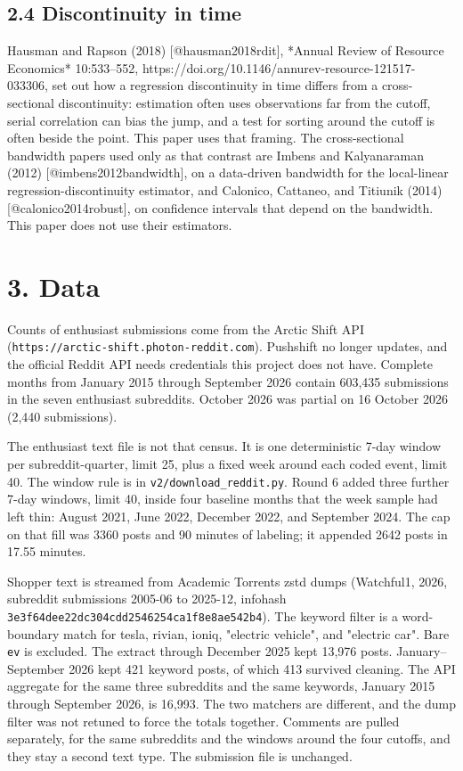 \documentclass[11pt]{article}
\begin{document}
\subsection{2.4 Discontinuity in time}

Hausman and Rapson (2018) [@hausman2018rdit], *Annual Review of Resource Economics* 10:533–552, https://doi.org/10.1146/annurev-resource-121517-033306, set out how a regression discontinuity in time differs from a cross-sectional discontinuity: estimation often uses observations far from the cutoff, serial correlation can bias the jump, and a test for sorting around the cutoff is often beside the point. This paper uses that framing. The cross-sectional bandwidth papers used only as that contrast are Imbens and Kalyanaraman (2012) [@imbens2012bandwidth], on a data-driven bandwidth for the local-linear regression-discontinuity estimator, and Calonico, Cattaneo, and Titiunik (2014) [@calonico2014robust], on confidence intervals that depend on the bandwidth. This paper does not use their estimators.


\section{3. Data}

Counts of enthusiast submissions come from the Arctic Shift API (\texttt{https://arctic-shift.photon-reddit.com}). Pushshift no longer updates, and the official Reddit API needs credentials this project does not have. Complete months from January 2015 through September 2026 contain 603,435 submissions in the seven enthusiast subreddits. October 2026 was partial on 16 October 2026 (2,440 submissions).


The enthusiast text file is not that census. It is one deterministic 7-day window per subreddit-quarter, limit 25, plus a fixed week around each coded event, limit 40. The window rule is in \texttt{v2/download\_reddit.py}. Round 6 added three further 7-day windows, limit 40, inside four baseline months that the week sample had left thin: August 2021, June 2022, December 2022, and September 2024. The cap on that fill was 3360 posts and 90 minutes of labeling; it appended 2642 posts in 17.55 minutes.


Shopper text is streamed from Academic Torrents zstd dumps (Watchful1, 2026, subreddit submissions 2005-06 to 2025-12, infohash \texttt{3e3f64dee22dc304cdd2546254ca1f8e8ae542b4}). The keyword filter is a word-boundary match for tesla, rivian, ioniq, "electric vehicle", and "electric car". Bare \texttt{ev} is excluded. The extract through December 2025 kept 13,976 posts. January–September 2026 kept 421 keyword posts, of which 413 survived cleaning. The API aggregate for the same three subreddits and the same keywords, January 2015 through September 2026, is 16,993. The two matchers are different, and the dump filter was not retuned to force the totals together. Comments are pulled separately, for the same subreddits and the windows around the four cutoffs, and they stay a second text type. The submission file is unchanged.
\end{document}
